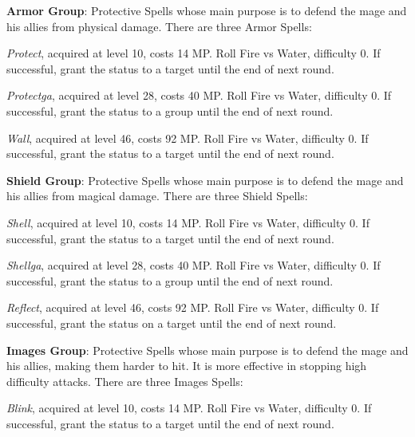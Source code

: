 \begin{multicols}{2}
    \ffcrystal[type=level,height=8pt]

    \textbf{Armor Group}: Protective Spells whose main purpose is to defend the mage and his allies from physical damage. There are three Armor Spells:

    \textit{Protect}, acquired at level 10, costs 14 MP\@. Roll Fire vs Water, difficulty 0. If successful, grant the  status to a target until the end of next round.

    \textit{Protectga}, acquired at level 28, costs 40 MP\@. Roll Fire vs Water, difficulty 0. If successful, grant the  status to a group until the end of next round.

    \textit{Wall}, acquired at level 46, costs 92 MP\@. Roll Fire vs Water, difficulty 0. If successful, grant the  status to a target until the end of next round.

    \ffcrystal[type=level,height=8pt]

    \textbf{Shield Group}: Protective Spells whose main purpose is to defend the mage and his allies from magical damage. There are three Shield Spells:

    \textit{Shell}, acquired at level 10, costs 14 MP\@. Roll Fire vs Water, difficulty 0. If successful, grant the  status to a target until the end of next round.

    \textit{Shellga}, acquired at level 28, costs 40 MP\@. Roll Fire vs Water, difficulty 0. If successful, grant the  status to a group until the end of next round.

    \textit{Reflect}, acquired at level 46, costs 92 MP\@. Roll Fire vs Water, difficulty 0. If successful, grant the  status on a target until the end of next round.

    \ffcrystal[type=level,height=8pt]

    \textbf{Images Group}: Protective Spells whose main purpose is to defend the mage and his allies, making them harder to hit. It is more effective in stopping high difficulty attacks. There are three Images Spells:

    \textit{Blink}, acquired at level 10, costs 14 MP\@. Roll Fire vs Water, difficulty 0. If successful, grant the  status to a target until the end of next round.


\end{multicols}

